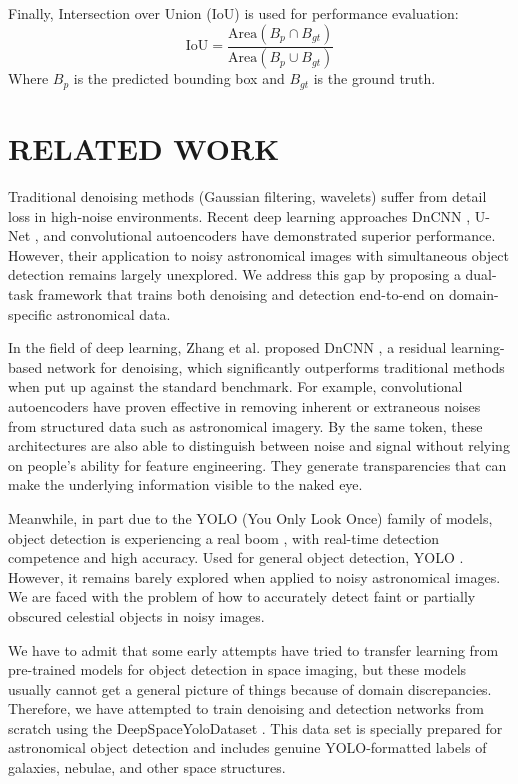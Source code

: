 \documentclass[12pt, conference]{IEEEtran}
\begin{document}
Finally, Intersection over Union (IoU) is used for performance evaluation:
$$\text{IoU} = \frac{\text{Area}(B_p \cap B_{gt})}{\text{Area}(B_p \cup B_{gt})}$$
Where $B_p$ is the predicted bounding box and $B_{gt}$ is the ground truth.

\newpage
\newpage
\section{RELATED WORK}
Traditional denoising methods (Gaussian filtering, wavelets) suffer from detail loss in high-noise environments. Recent deep learning approaches DnCNN \cite{zhang2017beyond}, U-Net \cite{ronneberger2015u}, and convolutional autoencoders \cite{hinton2006reducing} have demonstrated superior performance. However, their application to noisy astronomical images with simultaneous object detection remains largely unexplored. We address this gap by proposing a dual-task framework that trains both denoising and detection end-to-end on domain-specific astronomical data.

In the field of deep learning, Zhang et al. \cite{zhang2017beyond} proposed DnCNN \cite{zhang2017beyond}, a residual learning-based network for denoising, which significantly outperforms traditional methods when put up against the standard benchmark. For example, convolutional autoencoders \cite{hinton2006reducing}  have proven effective in removing inherent or extraneous noises from structured data such as astronomical imagery. By the same token, these architectures are also able to distinguish between noise and signal without relying on people's ability for feature engineering. They generate transparencies that can make the underlying information visible to the naked eye.

Meanwhile, in part due to the YOLO \cite{redmon2016you} (You Only Look Once) family of models, object detection is experiencing a real boom \cite{redmon2016you}, with real-time detection competence and high accuracy. Used for general object detection, YOLO \cite{redmon2016you}. However, it remains barely explored when applied to noisy astronomical images. We are faced with the problem of how to accurately detect faint or partially obscured celestial objects in noisy images.

We have to admit that some early attempts have tried to transfer learning from pre-trained models for object detection in space imaging, but these models usually cannot get a general picture of things because of domain discrepancies. Therefore, we have attempted to train denoising and detection networks from scratch using the DeepSpaceYoloDataset \cite{deepspaceyolo}. This data set is specially prepared for astronomical object detection and includes genuine YOLO-formatted \cite{redmon2016you} labels of galaxies, nebulae, and other space structures.
\end{document}
